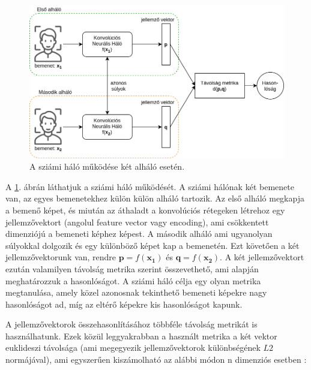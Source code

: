 
\begin{figure}[ht]
	\centering
	\includegraphics[width=1\columnwidth]{figures/siamese_sajat.png}
	\caption{A sziámi háló működése két alháló esetén.}
	\label{fig:siamese}
\end{figure}

A \ref{fig:siamese}. ábrán láthatjuk a sziámi háló működését. A sziámi hálónak két bemenete van, az egyes bemenetekhez külön külön alháló tartozik. Az első alháló megkapja a bemenő képet, és miután az áthaladt a konvolúciós rétegeken létrehoz egy jellemzővektort (angolul feature vector vagy encoding), ami csökkentett dimenziójú a bemeneti képhez képest. A második alháló ami ugyanolyan súlyokkal dolgozik és egy különböző képet kap a bemenetén. Ezt követően a két jellemzővektorunk van, rendre $\mathbf{p} = f(\mathbf{x_1})$ és $\mathbf{q} = f(\mathbf{x_2})$. A két jellemzővektort ezután valamilyen távolság metrika szerint összevethető, ami alapján meghatározzuk a hasonlóságot. A sziámi háló célja egy olyan metrika megtanulása, amely közel azonosnak tekinthető bemeneti képekre nagy hasonlóságot ad, míg az eltérő képekre kis hasonlóságot kapunk.

A jellemzővektorok összehasonlításához többféle távolság metrikát is használhatunk. Ezek közül leggyakrabban a használt metrika a két vektor euklideszi távolsága (ami megegyezik jellemzővektorok különbségének $L2$ normájával), ami egyszerűen kiszámolható az alábbi módon n dimenziós esetben \cite{tabak2014geometry}:

